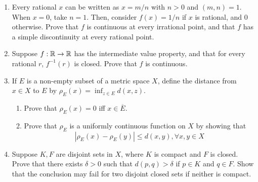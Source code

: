 \begin{enumerate}
\begin{proof}
    Following the hint, let $E_<$ be the set of all simple discontinuities $x$ of $f$ such that $f(x-) < f(x+)$. Then, associate to each $x \in E_<$ a triple of rational numbers $(p, q, r)$ such that $f(x-) < p < f(x+)$, $a < q < t < x$ implies $f(t) < p$, and $x < t < r < b$ implies $f(t) > p$. We claim that every triple represents a unique simple discontinuity of $f$:

    Suppose that $x$ and $x'$ are simple discontinuities and $x < x'$ WLOG, both represented by the triples $(p, q, r)$. Then in the interval $(x, x')$ lie in both the intervals $(x, r)$ and $(q, x')$, and thus $f(t)$ must be both less than, and greater than, $p$ at the same time, a contradiction. Thus, we must have $x = x'$, as required.

    We can define $E_>$ and associate triples a similar way. 
\end{proof}

\item %
Every rational $x$ can be written as $x = m/n$ with $n > 0$ and $(m, n) = 1$. When $x = 0$, take $n = 1$. Then, consider $f(x) = 1/n$ if $x$ is rational, and 0 otherwise. Prove that $f$ is continuous at every irrational point, and that $f$ has a simple discontinuity at every rational point.

\item %
Suppose $f: \mathbb{R} \rightarrow \mathbb{R}$ has the intermediate value property, and that for every rational $r$, $f^{-1}(r)$ is closed. Prove that $f$ is continuous.

\item %
If $E$ is a non-empty subset of a metric space $X$, define the distance from $x \in X$ to $E$ by $\rho_E(x) = \inf_{z \in E} d(x, z)$.
\begin{enumerate}
\item Prove that $\rho_E(x) = 0$ iff $x \in \overline{E}$.
\item Prove that $\rho_E$ is a uniformly continuous function on $X$ by showing that
\[
    |\rho_E(x) - \rho_E(y)| \le d(x, y), \forall x, y \in X
\]
\end{enumerate}

\item %
Suppose $K, F$ are disjoint sets in $X$, where $K$ is compact and $F$ is closed. Prove that there exists $\delta > 0$ such that $d(p, q) > \delta$ if $p \in K$ and $q \in F$. Show that the conclusion may fail for two disjoint closed sets if neither is compact.


\end{enumerate}
